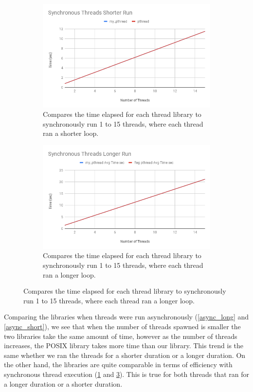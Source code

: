 \documentclass{article}
\begin{document}
\begin{figure}[!h]
        \begin{subfigure}[b]{.49\textwidth}
        \includegraphics[width=\textwidth]{Synchronous_Threads_Shorter_Run.png}
        \caption{Compares the time elapsed for each thread library to synchronously run 1 to 15 threads, where each thread ran a shorter loop.}
        \label{sync_short}
    \end{subfigure}
    \begin{subfigure}[b]{.49\textwidth}
        \includegraphics[width=\textwidth]{Synchronous_Threads_Longer_Run.png}
        \caption{Compares the time elapsed for each thread library to synchronously run 1 to 15 threads, where each thread ran a longer loop.}
        \label{sync_long}
    \end{subfigure}
\end{figure}

Comparing the libraries when threads were run asynchronously (\ref{async_long} and \ref{async_short}), we see that when the number of threads spawned is smaller the two libraries take the same amount of time, however as the number of threads increases, the POSIX library takes more time than our library. This trend is the same whether we ran the threads for a shorter duration or a longer duration. On the other hand, the libraries are quite comparable in terms of efficiency with synchronous thread execution (\ref{sync_short} and \ref{sync_long}). This is true for both threads that ran for a longer duration or a shorter duration. 
\end{document}
